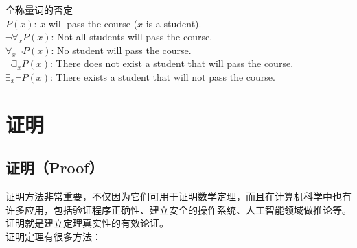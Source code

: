 \documentclass[12pt, openany, oneside]{book}
\begin{document}
\begin{tcolorbox}
    全称量词的否定 \\
    $ P(x) $: $ x $ will pass the course ($ x $ is a student). \\
    $ \neg \forall_x P(x) $: Not all students will pass the course. \\
    $ \forall_x \neg P(x) $: No student will pass the course. \\
    $ \neg \exists_x P(x) $: There does not exist a student that will pass the course. \\
    $ \exists_x \neg P(x) $: There exists a student that will not pass the course.
\end{tcolorbox}

\newpage

\section{证明}

\subsection{证明（Proof）}

证明方法非常重要，不仅因为它们可用于证明数学定理，而且在计算机科学中也有许多应用，包括验证程序正确性、建立安全的操作系统、人工智能领域做推论等。证明就是建立定理真实性的有效论证。 \\

证明定理有很多方法：
\end{document}
